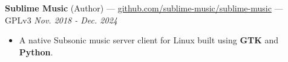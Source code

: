 \documentclass[10pt,letterpaper]{article}
\begin{document}
\vspace{3pt}
{\fontsize{11}{0}
\textbf{Sublime Music} (Author) ---
\href{https://github.com/sublime-music/sublime-music}{github.com/sublime-music/sublime-music} --- GPLv3}
\hfill \textit{Nov. 2018 - Dec. 2024}
\begin{itemize}
    \item A native Subsonic music server client for Linux built using
        \textbf{GTK} and \textbf{Python}.
\end{itemize}

\end{document}
